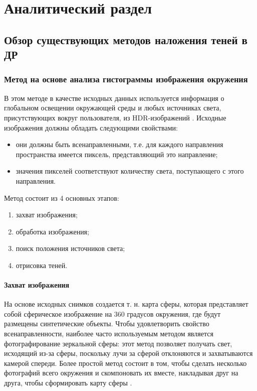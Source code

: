 \chapter{Аналитический раздел}


\section{Обзор существующих методов наложения теней в ДР}

\subsection{Метод на основе анализа гистограммы изображения окружения}

В этом методе в качестве исходных данных используется информация о глобальном освещении окружающей среды и любых источниках света, присутствующих вокруг пользователя, из HDR-изображений \cite{hdri, osti2019real}. Исходные изображения должны обладать следующими свойствами:

\begin{itemize}
	\item они должны быть всенаправленными, т.е. для каждого направления пространства имеется пиксель, представляющий это направление;
	\item значения пикселей соответствуют количеству света, поступающего с этого направления.
\end{itemize}

Метод состоит из 4 основных этапов:

\begin{enumerate}
	\item захват изображения;
	\item обработка изображения;
	\item поиск положения источников света;
	\item отрисовка теней.
\end{enumerate}

\subsubsection*{Захват изображения}

На основе исходных снимков создается т. н. карта сферы, которая представляет собой сферическое изображение на 360 градусов окружения, где будут размещены синтетические объекты. Чтобы удовлетворить свойство всенаправленности, наиболее часто используемым методом является фотографирование зеркальной сферы: этот метод позволяет получать свет, исходящий из-за сферы, поскольку лучи за сферой отклоняются и захватываются камерой спереди. Более простой метод состоит в том, чтобы сделать несколько фотографий всего окружения и скомпоновать их вместе, накладывая друг на друга, чтобы сформировать карту сферы \cite{osti2019real}.

